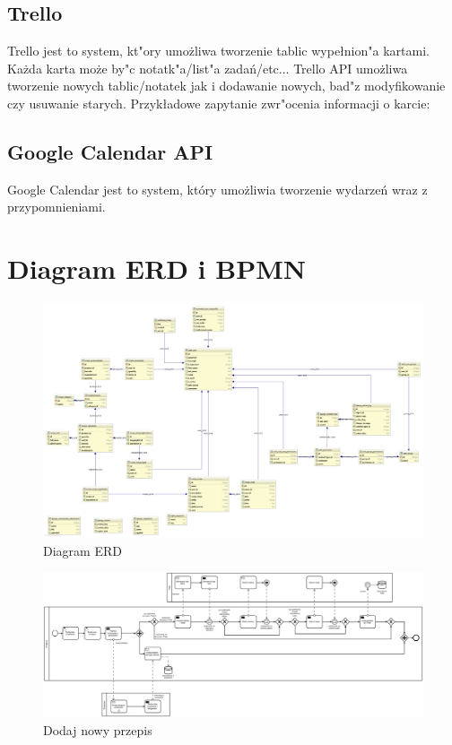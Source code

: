 \documentclass{article}
\begin{document}
\subsection{Trello}
Trello jest to system, kt"ory umo\.zliwa tworzenie tablic wypełnion"a kartami. Ka\.zda karta mo\.ze by"c notatk"a/list"a zadań/etc... Trello API umo\.zliwa tworzenie nowych tablic/notatek jak i dodawanie nowych, bad"z modyfikowanie czy usuwanie starych. Przykładowe zapytanie zwr"ocenia informacji o karcie:

\subsection{Google Calendar API}
Google Calendar jest to system, który umożliwia tworzenie wydarzeń wraz z przypomnieniami.

\section{Diagram ERD i BPMN}

\begin{landscape}
\begin{figure}[!ht]
  \centering
    \includegraphics[width=1.5\textwidth]{erd}\par\vspace{1cm}
  \caption{Diagram ERD}
\end{figure}
\end{landscape}

\begin{landscape}
\begin{figure}[!ht]
  \centering
    \includegraphics[width=1.5\textwidth]{ok}\par\vspace{1cm}
  \caption{Dodaj nowy przepis}
\end{figure}
\end{landscape}
\end{document}
